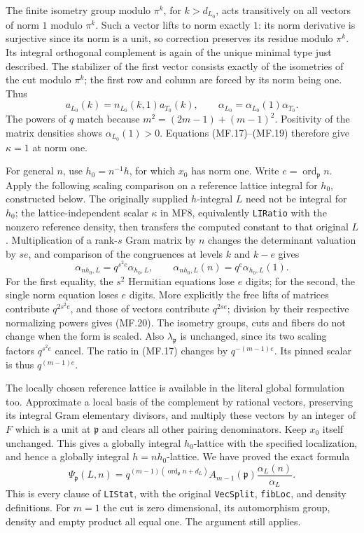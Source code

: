 The finite isometry group modulo \(\pi^k\), for \(k>d_{L_0}\),
acts transitively on all vectors of norm \(1\) modulo \(\pi^k\).
Such a vector lifts to norm exactly \(1\): its norm derivative is
surjective since its norm is a unit, so correction preserves its
residue modulo \(\pi^k\). Its integral orthogonal complement is
again of the unique minimal type just described.
The stabilizer of the first vector consists exactly of the
isometries of the cut modulo \(\pi^k\); the first row and column
are forced by its norm being one. Thus
\[
 a_{L_0}(k)=n_{L_0}(k,1)a_{T_0}(k),\qquad
                    \alpha_{L_0}=\alpha_{L_0}(1)\alpha_{T_0}.
                                                               \tag{MF.19}
\]
The powers of \(q\) match because
\(m^2=(2m-1)+(m-1)^2\). Positivity of the matrix densities shows
\(\alpha_{L_0}(1)>0\). Equations (MF.17)--(MF.19) therefore give
\(\kappa=1\) at norm one.

For general \(n\), use \(h_0=n^{-1}h\), for which \(x_0\) has norm
one. Write \(e=\operatorname{ord}_{\mathfrak p}n\).
Apply the following scaling comparison on a reference lattice
integral for \(h_0\), constructed below. The originally supplied
\(h\)-integral \(L\) need not be integral for \(h_0\); the
lattice-independent scalar \(\kappa\) in MF8, equivalently
\texttt{LIRatio} with the nonzero reference density, then transfers
the computed constant to that original \(L\).
Multiplication of a rank-\(s\) Gram matrix by \(n\) changes the
determinant valuation by \(se\), and comparison of the congruences
at levels \(k\) and \(k-e\) gives
\[
 \alpha_{n h_0,L}=q^{s^2e}\alpha_{h_0,L},\qquad
 \alpha_{n h_0,L}(n)=q^e\alpha_{h_0,L}(1).             \tag{MF.20}
\]
For the first equality, the \(s^2\) Hermitian equations lose \(e\)
digits; for the second, the single norm equation loses \(e\)
digits. More explicitly the free lifts of matrices contribute
\(q^{2s^2e}\), and those of vectors contribute \(q^{2se}\);
division by their respective normalizing powers gives (MF.20).
The isometry groups, cuts and fibers do not change when the form
is scaled. Also \(\lambda_{\mathfrak p}\) is unchanged, since its
two scaling factors \(q^{s^2e}\) cancel.
The ratio in (MF.17) changes by \(q^{-(m-1)e}\).
Its pinned scalar is thus \(q^{(m-1)e}\).

The locally chosen reference lattice is available in the literal
global formulation too. Approximate a local basis of the
complement by rational vectors, preserving its integral Gram
elementary divisors, and multiply these vectors by an integer of
\(F\) which is a unit at \(\mathfrak p\) and clears all other
pairing denominators. Keep \(x_0\) itself unchanged.
This gives a globally integral \(h_0\)-lattice with the specified
localization, and hence a globally integral \(h=n h_0\)-lattice.
We have proved the exact formula
\[
 \boxed{\displaystyle
 \Psi_{\mathfrak p}(L,n)=
 q^{(m-1)(\operatorname{ord}_{\mathfrak p}n+d_L)}
       A_{m-1}(\mathfrak p)\frac{\alpha_L(n)}{\alpha_L}.}
                                                               \tag{MF.21}
\]
This is every clause of \texttt{LIStat}, with the original
\texttt{VecSplit}, \texttt{fibLoc}, and density definitions.
For \(m=1\) the cut is zero dimensional, its automorphism group,
density and empty product all equal one. The argument still applies.

